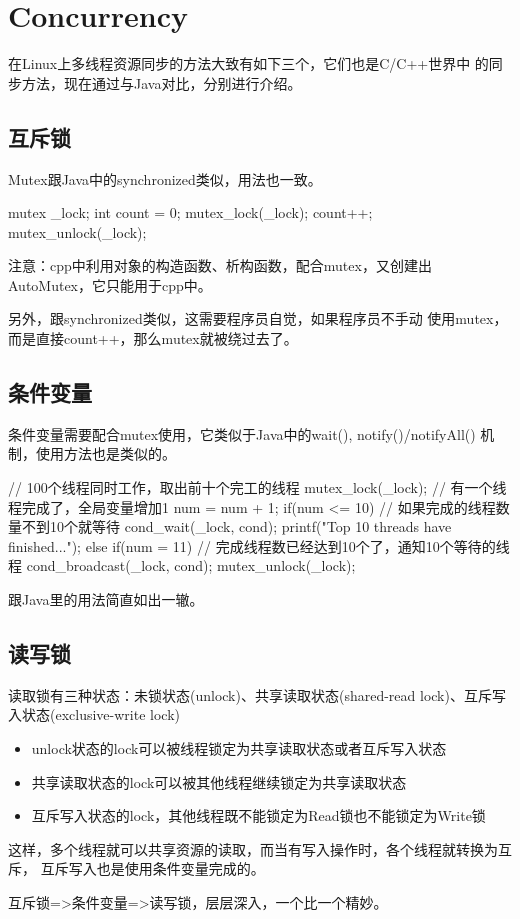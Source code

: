 ﻿\section[Concurrency]{Concurrency}
在Linux上多线程资源同步的方法大致有如下三个，它们也是C/C++世界中
的同步方法，现在通过与Java对比，分别进行介绍。

\subsection[互斥锁]{互斥锁}
Mutex跟Java中的synchronized类似，用法也一致。

\begin{cppcode}
  mutex _lock;
  int count = 0;
  mutex_lock(_lock);
  count++;
  mutex_unlock(_lock);
\end{cppcode}

注意：cpp中利用对象的构造函数、析构函数，配合mutex，又创建出
AutoMutex，它只能用于cpp中。

另外，跟synchronized类似，这需要程序员自觉，如果程序员不手动
使用mutex，而是直接count++，那么mutex就被绕过去了。

\subsection[条件变量]{条件变量}
条件变量需要配合mutex使用，它类似于Java中的wait(), notify()/notifyAll()
机制，使用方法也是类似的。

\begin{cppcode}
  // 100个线程同时工作，取出前十个完工的线程
  mutex_lock(_lock);
  // 有一个线程完成了，全局变量增加1
  num = num + 1;
  if(num <= 10) {
    // 如果完成的线程数量不到10个就等待
    cond_wait(_lock, cond);
    printf("Top 10 threads have finished...");
  } else if(num = 11) {
    // 完成线程数已经达到10个了，通知10个等待的线程
    cond_broadcast(_lock, cond);
  }
  mutex_unlock(_lock);
\end{cppcode}

跟Java里的用法简直如出一辙。

\subsection[读写锁]{读写锁}
读取锁有三种状态：未锁状态(unlock)、共享读取状态(shared-read lock)、互斥写入状态(exclusive-write lock)

\begin{itemize}
\item unlock状态的lock可以被线程锁定为共享读取状态或者互斥写入状态
\item 共享读取状态的lock可以被其他线程继续锁定为共享读取状态
\item 互斥写入状态的lock，其他线程既不能锁定为Read锁也不能锁定为Write锁
\end{itemize}

这样，多个线程就可以共享资源的读取，而当有写入操作时，各个线程就转换为互斥，
互斥写入也是使用条件变量完成的。

互斥锁=>条件变量=>读写锁，层层深入，一个比一个精妙。
